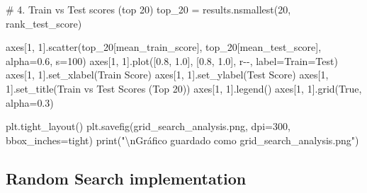 \documentclass[
  doc,
  floatsintext,
  longtable,
  a4paper,
  nolmodern,
  notxfonts,
  notimes,
  12pt,
  colorlinks=true,linkcolor=blue,citecolor=blue,urlcolor=blue]{apa7}
\newenvironment{Shaded}{\begin{snugshade}}{\end{snugshade}}
\newcommand{\BuiltInTok}[1]{\textcolor[rgb]{0.00,0.23,0.31}{#1}}
\newcommand{\CharTok}[1]{\textcolor[rgb]{0.13,0.47,0.30}{#1}}
\newcommand{\CommentTok}[1]{\textcolor[rgb]{0.37,0.37,0.37}{#1}}
\newcommand{\DecValTok}[1]{\textcolor[rgb]{0.68,0.00,0.00}{#1}}
\newcommand{\FloatTok}[1]{\textcolor[rgb]{0.68,0.00,0.00}{#1}}
\newcommand{\NormalTok}[1]{\textcolor[rgb]{0.00,0.23,0.31}{#1}}
\newcommand{\OperatorTok}[1]{\textcolor[rgb]{0.37,0.37,0.37}{#1}}
\newcommand{\StringTok}[1]{\textcolor[rgb]{0.13,0.47,0.30}{#1}}
\newcommand{\VariableTok}[1]{\textcolor[rgb]{0.07,0.07,0.07}{#1}}
\begin{document}
\begin{Shaded}
\begin{Highlighting}[]
\CommentTok{\# 4. Train vs Test scores (top 20)}
\NormalTok{top\_20 }\OperatorTok{=}\NormalTok{ results.nsmallest(}\DecValTok{20}\NormalTok{, }\StringTok{\textquotesingle{}rank\_test\_score\textquotesingle{}}\NormalTok{)}

\NormalTok{axes[}\DecValTok{1}\NormalTok{, }\DecValTok{1}\NormalTok{].scatter(top\_20[}\StringTok{\textquotesingle{}mean\_train\_score\textquotesingle{}}\NormalTok{], top\_20[}\StringTok{\textquotesingle{}mean\_test\_score\textquotesingle{}}\NormalTok{],}
\NormalTok{                  alpha}\OperatorTok{=}\FloatTok{0.6}\NormalTok{, s}\OperatorTok{=}\DecValTok{100}\NormalTok{)}
\NormalTok{axes[}\DecValTok{1}\NormalTok{, }\DecValTok{1}\NormalTok{].plot([}\FloatTok{0.8}\NormalTok{, }\FloatTok{1.0}\NormalTok{], [}\FloatTok{0.8}\NormalTok{, }\FloatTok{1.0}\NormalTok{], }\StringTok{\textquotesingle{}r{-}{-}\textquotesingle{}}\NormalTok{, label}\OperatorTok{=}\StringTok{\textquotesingle{}Train=Test\textquotesingle{}}\NormalTok{)}
\NormalTok{axes[}\DecValTok{1}\NormalTok{, }\DecValTok{1}\NormalTok{].set\_xlabel(}\StringTok{\textquotesingle{}Train Score\textquotesingle{}}\NormalTok{)}
\NormalTok{axes[}\DecValTok{1}\NormalTok{, }\DecValTok{1}\NormalTok{].set\_ylabel(}\StringTok{\textquotesingle{}Test Score\textquotesingle{}}\NormalTok{)}
\NormalTok{axes[}\DecValTok{1}\NormalTok{, }\DecValTok{1}\NormalTok{].set\_title(}\StringTok{\textquotesingle{}Train vs Test Scores (Top 20)\textquotesingle{}}\NormalTok{)}
\NormalTok{axes[}\DecValTok{1}\NormalTok{, }\DecValTok{1}\NormalTok{].legend()}
\NormalTok{axes[}\DecValTok{1}\NormalTok{, }\DecValTok{1}\NormalTok{].grid(}\VariableTok{True}\NormalTok{, alpha}\OperatorTok{=}\FloatTok{0.3}\NormalTok{)}

\NormalTok{plt.tight\_layout()}
\NormalTok{plt.savefig(}\StringTok{\textquotesingle{}grid\_search\_analysis.png\textquotesingle{}}\NormalTok{, dpi}\OperatorTok{=}\DecValTok{300}\NormalTok{, bbox\_inches}\OperatorTok{=}\StringTok{\textquotesingle{}tight\textquotesingle{}}\NormalTok{)}
\BuiltInTok{print}\NormalTok{(}\StringTok{"}\CharTok{\textbackslash{}n}\StringTok{Gráfico guardado como \textquotesingle{}grid\_search\_analysis.png\textquotesingle{}"}\NormalTok{)}
\end{Highlighting}
\end{Shaded}

\subsection{Random Search
implementation}\label{random-search-implementation}
\end{document}
